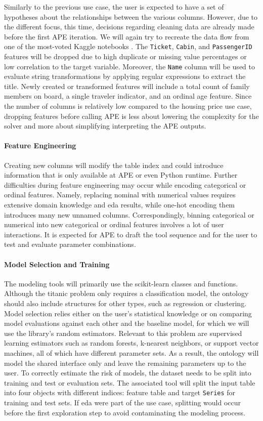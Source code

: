 Similarly to the previous use case, the user is expected to have a set of hypotheses about the relationships between the various columns. However, due to the different focus, this time, decisions regarding cleaning data are already made before the first APE iteration. We will again try to recreate the data flow from one of the most-voted Kaggle notebooks \cite{titanic}. The \verb|Ticket|, \verb|Cabin|, and \verb|PassengerID| features will be dropped due to high duplicate or missing value percentages or low correlation to the target variable. Moreover, the \verb|Name| column will be used to evaluate string transformations by applying regular expressions to extract the title. Newly created or transformed features will include a total count of family members on board, a single traveler indicator, and an ordinal age feature. Since the number of columns is relatively low compared to the housing price use case, dropping features before calling APE is less about lowering the complexity for the solver and more about simplifying interpreting the APE outputs.

\paragraph{Feature Engineering}
Creating new columns will modify the table index and could introduce information that is only available at APE or even Python runtime. Further difficulties during feature engineering may occur while encoding categorical or ordinal features. Namely, replacing nominal with numerical values requires extensive domain knowledge and \ac{eda} results, while one-hot encoding them introduces many new unnamed columns. Correspondingly, binning categorical or numerical into new categorical or ordinal features involves a lot of user interactions. It is expected for APE to draft the tool sequence and for the user to test and evaluate parameter combinations.

\paragraph{Model Selection and Training}
The modeling tools will primarily use the scikit-learn classes and functions. Although the titanic problem only requires a classification model, the ontology should also include structures for other types, such as regression or clustering. Model selection relies either on the user's statistical knowledge or on comparing model evaluations against each other and the baseline model, for which we will use the library’s random estimators. Relevant to this problem are supervised learning estimators such as random forests, k-nearest neighbors, or support vector machines, all of which have different parameter sets. As a result, the ontology will model the shared interface only and leave the remaining parameters up to the user. To correctly estimate the risk of models, the dataset needs to be split into training and test or evaluation sets. The associated tool will split the input table into four objects with different indices: feature table and target \texttt{Series} for training and test sets. If \ac{eda} were part of the use case, splitting would occur before the first exploration step to avoid contaminating the modeling process.

